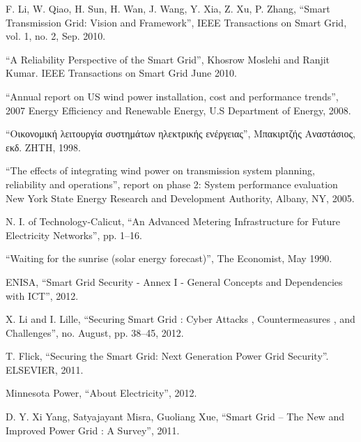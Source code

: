 \documentclass[12pt, a4paper, oneside]{report}
\begin{document}




\clearpage


\begin{thebibliography}{99}

F. Li, W. Qiao, H. Sun, H. Wan, J. Wang, Y. Xia, Z. Xu, P. Zhang, ``Smart Transmission Grid: Vision and Framework'', IEEE Transactions on Smart Grid, vol. 1, no. 2, Sep. 2010.

``A Reliability Perspective of the Smart Grid'', Khosrow Moslehi and Ranjit Kumar. IEEE Transactions on Smart Grid June 2010.

``Annual report on US wind power installation, cost and performance trends'', 2007 Energy Ef\mbox{}f\mbox{}iciency and Renewable Energy, U.S Department of Energy, 2008.

``Οικονομική λειτουργία συστημάτων ηλεκτρικής ενέργειας'', Μπακιρτζής Αναστάσιος, εκδ. ΖΗΤΗ, 1998.

``The ef\mbox{}fects of integrating wind power on transmission system planning, reliability and operations'', report on phase 2: System performance evaluation New York State Energy Research and Development Authority, Albany, NY, 2005.

N. I. of Technology-Calicut, ``An Advanced Metering Infrastructure for Future Electricity Networks'', pp. 1–16.

``Waiting for the sunrise (solar energy forecast)'', The Economist, May 1990.

ENISA, ``Smart Grid Security - Annex I - General Concepts and Dependencies with ICT'', 2012.

X. Li and I. Lille, ``Securing Smart Grid : Cyber Attacks , Countermeasures , and Challenges'', no. August, pp. 38–45, 2012.

T. Flick, ``Securing the Smart Grid: Next Generation Power Grid Security''. ELSEVIER, 2011.

Minnesota Power, ``About Electricity'', 2012.

D. Y. Xi Yang, Satyajayant Misra, Guoliang Xue, ``Smart Grid – The New and Improved Power Grid : A Survey'', 2011.


\end{thebibliography}
\end{document}
